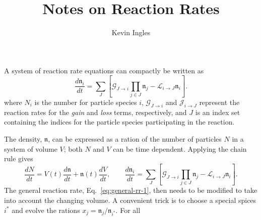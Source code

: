 \documentclass{article}
\begin{document}
	\title{Notes on Reaction Rates}
	\author{Kevin Ingles}
	\date{}
	\maketitle
	
	A system of reaction rate equations can compactly be written as
	\begin{equation}
		\label{eq:general-rr-1}
		\frac{d \mathfrak n_i}{dt}
		=
		\sum_J \left\lbrack 
			\mathcal G_{J\to i} \prod_{j\in J} \mathfrak n_j
			-
			\mathcal L_{i\to J} \mathfrak n_i
		\right\rbrack.
	\end{equation}
	where $N_i$ is the number for particle species $i$, $\mathcal G_{J\to i}$ and $\mathcal J_{i\to J}$ represent the reaction rates for the \emph{gain} and \emph{loss} terms, respectively, and $J$ is an index set containing the indices for the particle species participating in the reaction.
	
	The density, $\mathfrak n$, can be expressed as a ration of the number of particles $N$ in a system of volume $V$; both $N$ and $V$ can be time dependent.
	Applying the chain rule gives
	\begin{equation}
		\frac{dN}{dt}
		=
		V(t) \frac{d\mathfrak n}{dt} + \mathfrak n(t) \frac{d V}{dt},
		\qquad
		\frac{d \mathfrak n_i}{dt}
		=
		\sum_J \left\lbrack 
		\mathcal G_{J\to i} \prod_{j\in J} \mathfrak n_j
		-
		\mathcal L_{i\to J} \mathfrak n_i
		\right\rbrack.
	\end{equation}
	The general reaction rate, Eq.~\eqref{eq:general-rr-1}, then needs to be modified to take into account the changing volume.
	A convenient trick is to choose a special spices $i^\ast$ and evolve the rations $x_j = \mathfrak n_j / \mathfrak n_{i^\ast}$.
	For all 
\end{document}
